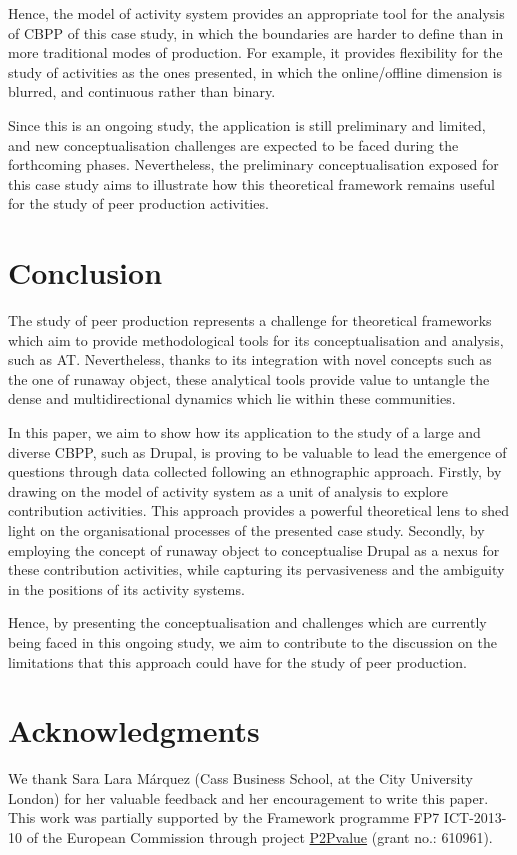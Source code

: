 \documentclass[a4paper, 12pt]{article}
\begin{document}
Hence, the model of activity system provides an appropriate tool for the analysis of CBPP of this case study, in which the boundaries are harder to define than in more traditional modes of production. For example, it provides flexibility for the study of activities as the ones presented, in which the online/offline dimension is blurred, and continuous rather than binary. 


Since this is an ongoing study, the application is still preliminary and limited, and new conceptualisation challenges are expected to be faced during the forthcoming phases. Nevertheless, the preliminary conceptualisation exposed for this case study aims to illustrate how this theoretical framework remains useful for the study of peer production activities.

\newpage
\section{Conclusion}
\label{sec:conclusion}

The study of peer production represents a challenge for theoretical frameworks which aim to provide methodological tools for its conceptualisation and analysis, such as AT. Nevertheless, thanks to its integration with novel concepts such as the one of runaway object, these analytical tools provide value to untangle the dense and multidirectional dynamics which lie within these communities.

In this paper, we aim to show how its application to the study of a large and diverse CBPP, such as Drupal, is proving to be valuable to lead the emergence of questions through data collected following an ethnographic approach. Firstly, by drawing on the model of activity system as a unit of analysis to explore contribution activities. This approach provides a powerful theoretical lens to shed light on the organisational processes of the presented case study. Secondly, by employing the concept of runaway object to conceptualise Drupal as a nexus for these contribution activities, while capturing its pervasiveness and the ambiguity in the positions of its activity systems.

Hence, by presenting the conceptualisation and challenges which are currently being faced in this ongoing study, we aim to contribute to the discussion on the limitations that this approach could have for the study of peer production.

\section*{Acknowledgments}

We thank Sara Lara Márquez (Cass Business School, at the City University London) for her valuable feedback and her encouragement to write this paper. This work was partially supported by the Framework programme FP7 ICT-2013-10 of the European Commission through project \href{http://www.p2pvalue.eu/}{P2Pvalue} (grant no.: 610961).


\printbibliography
\end{document}
